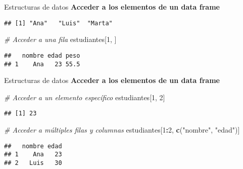 \documentclass[
  ignorenonframetext,
]{beamer}
\newenvironment{Shaded}{\begin{snugshade}}{\end{snugshade}}
\newcommand{\CommentTok}[1]{\textcolor[rgb]{0.56,0.35,0.01}{\textit{#1}}}
\newcommand{\DecValTok}[1]{\textcolor[rgb]{0.00,0.00,0.81}{#1}}
\newcommand{\FunctionTok}[1]{\textcolor[rgb]{0.13,0.29,0.53}{\textbf{#1}}}
\newcommand{\NormalTok}[1]{#1}
\newcommand{\SpecialCharTok}[1]{\textcolor[rgb]{0.81,0.36,0.00}{\textbf{#1}}}
\newcommand{\StringTok}[1]{\textcolor[rgb]{0.31,0.60,0.02}{#1}}
\begin{document}
\begin{frame}[fragile]{Estructuras de datos}
\label{estructuras-de-datos-4}
\textbf{Acceder a los elementos de un data frame}

\begin{Shaded}
\end{Shaded}

\begin{verbatim}
## [1] "Ana"   "Luis"  "Marta"
\end{verbatim}

\begin{Shaded}
\begin{Highlighting}[]
\CommentTok{\# Acceder a una fila}
\NormalTok{estudiantes[}\DecValTok{1}\NormalTok{, ]}
\end{Highlighting}
\end{Shaded}

\begin{verbatim}
##   nombre edad peso
## 1    Ana   23 55.5
\end{verbatim}
\end{frame}

\begin{frame}[fragile]{Estructuras de datos}
\label{estructuras-de-datos-5}
\textbf{Acceder a los elementos de un data frame}

\begin{Shaded}
\begin{Highlighting}[]
\CommentTok{\# Acceder a un elemento específico}
\NormalTok{estudiantes[}\DecValTok{1}\NormalTok{, }\DecValTok{2}\NormalTok{]}
\end{Highlighting}
\end{Shaded}

\begin{verbatim}
## [1] 23
\end{verbatim}

\begin{Shaded}
\begin{Highlighting}[]
\CommentTok{\# Acceder a múltiples filas y columnas}
\NormalTok{estudiantes[}\DecValTok{1}\SpecialCharTok{:}\DecValTok{2}\NormalTok{, }\FunctionTok{c}\NormalTok{(}\StringTok{"nombre"}\NormalTok{, }\StringTok{"edad"}\NormalTok{)]}
\end{Highlighting}
\end{Shaded}

\begin{verbatim}
##   nombre edad
## 1    Ana   23
## 2   Luis   30
\end{verbatim}
\end{frame}
\end{document}
